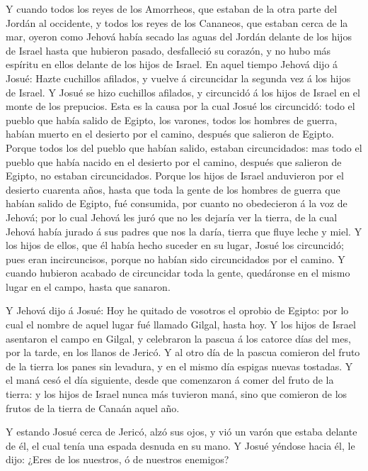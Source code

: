  Y cuando todos los reyes de los Amorrheos, que estaban de
la otra parte del Jordán al occidente, y todos los reyes de los
Cananeos, que estaban cerca de la mar, oyeron como Jehová había secado
las aguas del Jordán delante de los hijos de Israel hasta que hubieron
pasado, desfalleció su corazón, y no hubo más espíritu en ellos delante
de los hijos de Israel.  En aquel tiempo Jehová dijo á
Josué: Hazte cuchillos afilados, y vuelve á circuncidar la segunda vez á
los hijos de Israel.  Y Josué se hizo cuchillos afilados, y
circuncidó á los hijos de Israel en el monte de los prepucios.
 Esta es la causa por la cual Josué los circuncidó: todo el
pueblo que había salido de Egipto, los varones, todos los hombres de
guerra, habían muerto en el desierto por el camino, después que salieron
de Egipto.  Porque todos los del pueblo que habían salido,
estaban circuncidados: mas todo el pueblo que había nacido en el
desierto por el camino, después que salieron de Egipto, no estaban
circuncidados.  Porque los hijos de Israel anduvieron por el
desierto cuarenta años, hasta que toda la gente de los hombres de guerra
que habían salido de Egipto, fué consumida, por cuanto no obedecieron á
la voz de Jehová; por lo cual Jehová les juró que no les dejaría ver la
tierra, de la cual Jehová había jurado á sus padres que nos la daría,
tierra que fluye leche y miel.  Y los hijos de ellos, que él
había hecho suceder en su lugar, Josué los circuncidó; pues eran
incircuncisos, porque no habían sido circuncidados por el camino.
 Y cuando hubieron acabado de circuncidar toda la gente,
quedáronse en el mismo lugar en el campo, hasta que sanaron.

 Y Jehová dijo á Josué: Hoy he quitado de vosotros el
oprobio de Egipto: por lo cual el nombre de aquel lugar fué llamado
Gilgal, hasta hoy.  Y los hijos de Israel asentaron el
campo en Gilgal, y celebraron la pascua á los catorce días del mes, por
la tarde, en los llanos de Jericó.  Y al otro día de la
pascua comieron del fruto de la tierra los panes sin levadura, y en el
mismo día espigas nuevas tostadas.  Y el maná cesó el día
siguiente, desde que comenzaron á comer del fruto de la tierra: y los
hijos de Israel nunca más tuvieron maná, sino que comieron de los frutos
de la tierra de Canaán aquel año.

 Y estando Josué cerca de Jericó, alzó sus ojos, y vió un
varón que estaba delante de él, el cual tenía una espada desnuda en su
mano. Y Josué yéndose hacia él, le dijo: ¿Eres de los nuestros, ó de
nuestros enemigos?

